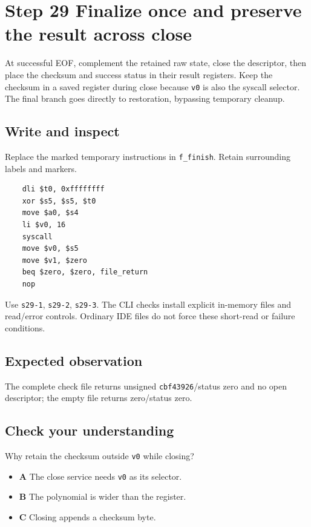 \section{Step 29 Finalize once and preserve the result across close}\label{crc-s29}

At successful EOF, complement the retained raw state, close the descriptor, then place the checksum and success status in their result registers. Keep the checksum in a saved register during close because \texttt{v0} is also the syscall selector. The final branch goes directly to restoration, bypassing temporary cleanup.

\subsection{Write and inspect}
Replace the marked temporary instructions in \texttt{f\_finish}. Retain surrounding labels and markers.

\begin{verbatim}
    dli $t0, 0xffffffff
    xor $s5, $s5, $t0
    move $a0, $s4
    li $v0, 16
    syscall
    move $v0, $s5
    move $v1, $zero
    beq $zero, $zero, file_return
    nop
\end{verbatim}

Use \texttt{s29-1}, \texttt{s29-2}, \texttt{s29-3}. The CLI checks install explicit in-memory files and read/error controls. Ordinary IDE files do not force these short-read or failure conditions.

\subsection{Expected observation}
The complete check file returns unsigned \texttt{cbf43926}/status zero and no open descriptor; the empty file returns zero/status zero.

\subsection{Check your understanding}
Why retain the checksum outside \texttt{v0} while closing?

\begin{itemize}
\item \textbf{A} The close service needs \texttt{v0} as its selector.
\item \textbf{B} The polynomial is wider than the register.
\item \textbf{C} Closing appends a checksum byte.
\end{itemize}
